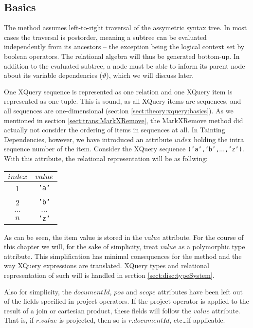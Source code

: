 \subsection{Basics}
\label{sect:trans:TD:basics}
The method assumes left-to-right traversal of the assymetric syntax tree. In most cases the traversal is
postorder, meaning a subtree can be evaluated independently from its ancestors -- the exception being the logical
context set by boolean operators. The relational algebra will thus be generated bottom-up. In addition to the
evaluated subtree, a node must be able to inform its parent node about its variable dependencies ($\vartheta$),
which we will discuss later.

One XQuery sequence is represented as one relation and one XQuery item is represented as one tuple. This is sound,
as all XQuery items are sequences, and all sequences are one-dimensional (section
\ref{sect:theory:xquery:basics}). As we mentioned in section \ref{sect:trans:MarkXRemove}, the MarkXRemove method
did actually not consider the ordering of items in sequences at all. In Tainting Dependencies, however, we have
introduced an attribute $index$ holding the intra sequence number of the item. Consider the XQuery sequence
\texttt{('a','b',}$\ldots$\texttt{,'z')}. With this attribute, the relational representation will be as follwing:

\begin{center}
\begin{tabular}{|c|c|} \hline
$index$ & $value$ \\\hline
1		& \texttt{'a'} \\\hline
2		& \texttt{'b'} \\\hline
$\ldots$& $\ldots$ \\\hline
$n$		& \texttt{'z'} \\\hline
\end{tabular}
\end{center}


As can be seen, the item value is stored in the $value$ attribute. For the course of this chapter we will, for the
sake of simplicity, treat $value$ as a polymorphic type attribute. This simplification has minimal consequences
for the method and the way XQuery expressions are translated. XQuery types and relational representation of such
will is handled in section \ref{sect:disc:typeSystem}. 

Also for simplicity, the $documentId$, $pos$ and $scope$ attributes have been left out of the
fields specified in \textsf{project} operators. If the \textsf{project} operator is applied to the result of a
join or cartesian product, these fields will follow the $value$ attribute. That is, if $r.value$ is projected,
then so is $r.documentId$, etc\ldots if applicable.

